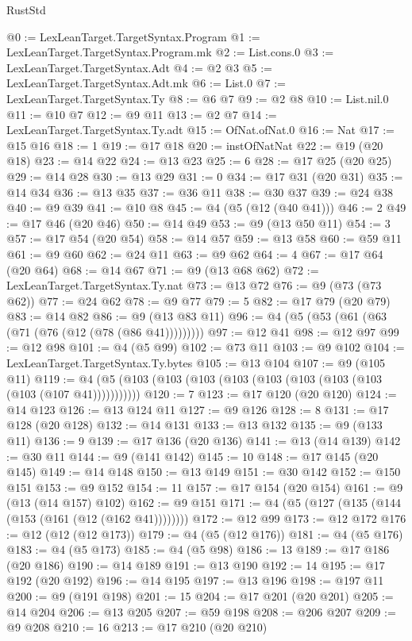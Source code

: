 \begin{lexlean}{RustStd}
\begin{coremodule}
{\begin{coremodule}
{{{{{{{{{{{{{{{{{{{{{{{{{{@0 := LexLeanTarget.TargetSyntax.Program
@1 := LexLeanTarget.TargetSyntax.Program.mk
@2 := List.cons.{0}
@3 := LexLeanTarget.TargetSyntax.Adt
@4 := @2 @3
@5 := LexLeanTarget.TargetSyntax.Adt.mk
@6 := List.{0}
@7 := LexLeanTarget.TargetSyntax.Ty
@8 := @6 @7
@9 := @2 @8
@10 := List.nil.{0}
@11 := @10 @7
@12 := @9 @11
@13 := @2 @7
@14 := LexLeanTarget.TargetSyntax.Ty.adt
@15 := OfNat.ofNat.{0}
@16 := Nat
@17 := @15 @16
@18 := 1
@19 := @17 @18
@20 := instOfNatNat
@22 := @19 (@20 @18)
@23 := @14 @22
@24 := @13 @23
@25 := 6
@28 := @17 @25 (@20 @25)
@29 := @14 @28
@30 := @13 @29
@31 := 0
@34 := @17 @31 (@20 @31)
@35 := @14 @34
@36 := @13 @35
@37 := @36 @11
@38 := @30 @37
@39 := @24 @38
@40 := @9 @39
@41 := @10 @8
@45 := @4 (@5 (@12 (@40 @41)))
@46 := 2
@49 := @17 @46 (@20 @46)
@50 := @14 @49
@53 := @9 (@13 @50 @11)
@54 := 3
@57 := @17 @54 (@20 @54)
@58 := @14 @57
@59 := @13 @58
@60 := @59 @11
@61 := @9 @60
@62 := @24 @11
@63 := @9 @62
@64 := 4
@67 := @17 @64 (@20 @64)
@68 := @14 @67
@71 := @9 (@13 @68 @62)
@72 := LexLeanTarget.TargetSyntax.Ty.nat
@73 := @13 @72
@76 := @9 (@73 (@73 @62))
@77 := @24 @62
@78 := @9 @77
@79 := 5
@82 := @17 @79 (@20 @79)
@83 := @14 @82
@86 := @9 (@13 @83 @11)
@96 := @4 (@5 (@53 (@61 (@63 (@71 (@76 (@12 (@78 (@86 @41)))))))))
@97 := @12 @41
@98 := @12 @97
@99 := @12 @98
@101 := @4 (@5 @99)
@102 := @73 @11
@103 := @9 @102
@104 := LexLeanTarget.TargetSyntax.Ty.bytes
@105 := @13 @104
@107 := @9 (@105 @11)
@119 := @4 (@5 (@103 (@103 (@103 (@103 (@103 (@103 (@103 (@103 (@103 (@107 @41)))))))))))
@120 := 7
@123 := @17 @120 (@20 @120)
@124 := @14 @123
@126 := @13 @124 @11
@127 := @9 @126
@128 := 8
@131 := @17 @128 (@20 @128)
@132 := @14 @131
@133 := @13 @132
@135 := @9 (@133 @11)
@136 := 9
@139 := @17 @136 (@20 @136)
@141 := @13 (@14 @139)
@142 := @30 @11
@144 := @9 (@141 @142)
@145 := 10
@148 := @17 @145 (@20 @145)
@149 := @14 @148
@150 := @13 @149
@151 := @30 @142
@152 := @150 @151
@153 := @9 @152
@154 := 11
@157 := @17 @154 (@20 @154)
@161 := @9 (@13 (@14 @157) @102)
@162 := @9 @151
@171 := @4 (@5 (@127 (@135 (@144 (@153 (@161 (@12 (@162 @41))))))))
@172 := @12 @99
@173 := @12 @172
@176 := @12 (@12 (@12 @173))
@179 := @4 (@5 (@12 @176))
@181 := @4 (@5 @176)
@183 := @4 (@5 @173)
@185 := @4 (@5 @98)
@186 := 13
@189 := @17 @186 (@20 @186)
@190 := @14 @189
@191 := @13 @190
@192 := 14
@195 := @17 @192 (@20 @192)
@196 := @14 @195
@197 := @13 @196
@198 := @197 @11
@200 := @9 (@191 @198)
@201 := 15
@204 := @17 @201 (@20 @201)
@205 := @14 @204
@206 := @13 @205
@207 := @59 @198
@208 := @206 @207
@209 := @9 @208
@210 := 16
@213 := @17 @210 (@20 @210)
}}}}}}}}}}}}}}}}}}}}}}}}}}
\end{coremodule}}
\end{coremodule}
\end{lexlean}
